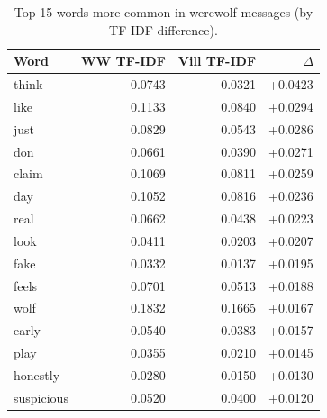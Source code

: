 \begin{table}[ht]
\caption{Top 15 words more common in werewolf messages (by TF-IDF difference).}
\label{tab:tfidf_ww}
\centering
\small
\begin{tabular}{lrrr}
\toprule
\textbf{Word} & \textbf{WW TF-IDF} & \textbf{Vill TF-IDF} & \textbf{$\Delta$} \\
\midrule
think  & 0.0743 & 0.0321 & +0.0423 \\
like   & 0.1133 & 0.0840 & +0.0294 \\
just   & 0.0829 & 0.0543 & +0.0286 \\
don    & 0.0661 & 0.0390 & +0.0271 \\
claim  & 0.1069 & 0.0811 & +0.0259 \\
day    & 0.1052 & 0.0816 & +0.0236 \\
real   & 0.0662 & 0.0438 & +0.0223 \\
look   & 0.0411 & 0.0203 & +0.0207 \\
fake   & 0.0332 & 0.0137 & +0.0195 \\
feels  & 0.0701 & 0.0513 & +0.0188 \\
wolf   & 0.1832 & 0.1665 & +0.0167 \\
early  & 0.0540 & 0.0383 & +0.0157 \\
play   & 0.0355 & 0.0210 & +0.0145 \\
honestly & 0.0280 & 0.0150 & +0.0130 \\
suspicious & 0.0520 & 0.0400 & +0.0120 \\
\bottomrule
\end{tabular}
\end{table}

